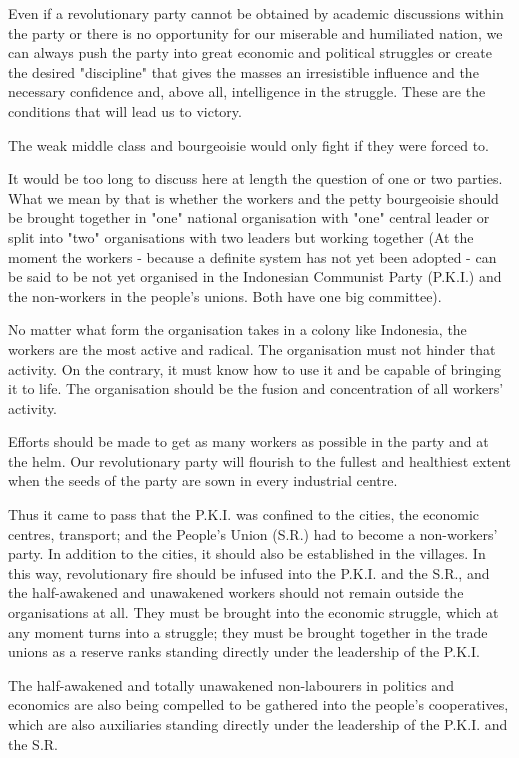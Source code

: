 Even if a revolutionary party cannot be obtained by academic discussions within the party or there is no opportunity for our miserable 
and humiliated nation, we can always push the party into great economic and political struggles or create the desired "discipline" 
that gives the masses an irresistible influence and the necessary confidence and, above all, intelligence in the struggle. These are 
the conditions that will lead us to victory.\nline

The weak middle class and bourgeoisie would only fight if they were forced to.\nline

It would be too long to discuss here at length the question of one or two parties. What we mean by that is whether the workers and 
the petty bourgeoisie should be brought together in "one" national organisation with "one" central leader or split into "two" 
organisations with two leaders but working together (At the moment the workers - because a definite system has not yet been adopted - 
can be said to be not yet organised in the Indonesian Communist Party (P.K.I.) and the non-workers in the people's unions. 
Both have one big committee).\nline

No matter what form the organisation takes in a colony like Indonesia, the workers are the most active and radical. 
The organisation must not hinder that activity. On the contrary, it must know how to use it and be capable of bringing it to life. 
The organisation should be the fusion and concentration of all workers' activity.\nline

Efforts should be made to get as many workers as possible in the party and at the helm. 
Our revolutionary party will flourish to the fullest and healthiest extent when the seeds of the party are sown in every industrial centre.\nline

Thus it came to pass that the P.K.I. was confined to the cities, the economic centres, transport; and the People's Union (S.R.) 
had to become a non-workers' party. In addition to the cities, it should also be established in the villages. In this way, 
revolutionary fire should be infused into the P.K.I. and the S.R., and the half-awakened and unawakened workers should not 
remain outside the organisations at all. They must be brought into the economic struggle, which at any moment turns into a struggle; 
they must be brought together in the trade unions as a reserve ranks standing directly under the leadership of the P.K.I.\nline

The half-awakened and totally unawakened non-labourers in politics and economics are also being compelled to be gathered into 
the people's cooperatives, which are also auxiliaries standing directly under the leadership of the P.K.I. and the S.R.\nline

